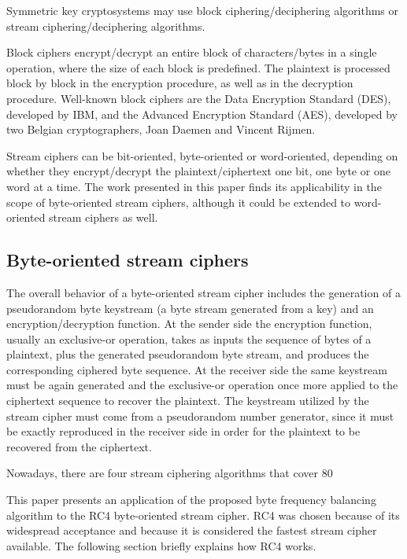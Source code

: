 \documentclass[conference]{IEEEtran}
\begin{document}
Symmetric key cryptosystems may use block ciphering/deciphering algorithms or stream ciphering/deciphering algorithms. 

Block ciphers encrypt/decrypt an entire block of characters/bytes in a single operation, where the size of each block is predefined. The plaintext is processed block by block in the encryption procedure, as well as in the decryption procedure. Well-known block ciphers are the Data Encryption Standard (DES), developed by IBM, and the Advanced Encryption Standard (AES), developed by two Belgian cryptographers, Joan Daemen and Vincent Rijmen.

Stream ciphers can be bit-oriented, byte-oriented or word-oriented, depending on whether they encrypt/decrypt the plaintext/ciphertext one bit, one byte or one word at a time. The work presented in this paper finds its applicability in the scope of byte-oriented stream ciphers, although it could be extended to word-oriented stream ciphers as well.

\subsection{Byte-oriented stream ciphers}

The overall behavior of a byte-oriented stream cipher includes the generation of a pseudorandom byte keystream (a byte stream generated from a key) and an encryption/decryption function. At the sender side the encryption function, usually an exclusive-or operation, takes as inputs the sequence of bytes of a plaintext, plus the generated pseudorandom byte stream, and produces the corresponding ciphered byte sequence. At the receiver side the same keystream must be again generated and the exclusive-or operation once more applied to the ciphertext sequence to recover the plaintext. The keystream utilized by the stream cipher must come from a pseudorandom number generator, since it must be exactly reproduced in the receiver side in order for the plaintext to be recovered from the ciphertext.

Nowadays, there are four stream ciphering algorithms that cover 80%

This paper presents an application of the proposed byte frequency balancing algorithm to the RC4 byte-oriented stream cipher. RC4 was chosen because of its widespread acceptance and because it is considered the fastest stream cipher available. The following section briefly explains how RC4 works.
\end{document}
